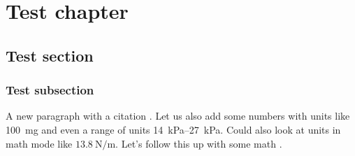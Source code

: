 \chapter{Test chapter}
\section{Test section}
\blindtext
\subsection{Test subsection}
\blindtext

A new paragraph with a citation \cite{hildebrand2017whole}. Let us also add some numbers with units like \SI{100}{\milli\gram} and even a range of units \SIrange{14}{27}{\kilo\pascal}. \blindtext Could also look at units in math mode like $\SI{13.8}{\newton\per\metre}$. Let's follow this up with some math \cite{delpiano2018automated}.

\blindmathpaper
